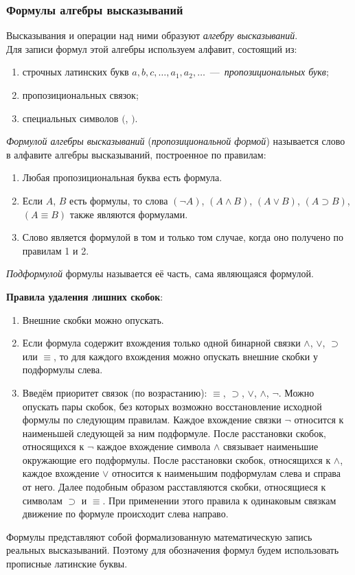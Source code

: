 \subsubsection{Формулы алгебры высказываний}\label{par:formulas_boolean}
Высказывания и операции над ними образуют \textit{алгебру высказываний}. \\
Для записи формул этой алгебры используем алфавит, состоящий из:
\begin{enumerate}
    \item строчных латинских букв $a, b, c, \dots, a_1, a_2, \dots$~---~\textit{пропозициональных букв}; 
    \item пропозициональных связок;
    \item специальных символов $($, $)$.
\end{enumerate}
\begin{definition*}
    \textit{Формулой алгебры высказываний} (\textit{пропозициональной формой}) называется слово в алфавите алгебры высказываний, построенное по правилам:
    \begin{enumerate}
        \item Любая пропозициональная буква есть формула.
        \item Если $A$, $B$ есть формулы, то слова $(\neg A)$, $(A \land B)$, $(A \lor B)$, $(A \supset B)$, $(A \equiv B)$ также являются формулами.
        \item Слово является формулой в том и только том случае, когда оно получено по правилам 1 и 2.
    \end{enumerate}
\end{definition*}
\begin{definition*}
    \textit{Подформулой} формулы называется её часть, сама являющаяся формулой.
\end{definition*}
\textbf{Правила удаления лишних скобок}:
\begin{enumerate}
    \item Внешние скобки можно опускать.
    \item Если формула содержит вхождения только одной бинарной связки $\land$, $\lor$, $\supset$ или $\equiv$, то для каждого вхождения можно опускать внешние скобки у подформулы слева.
    \item Введём приоритет связок (по возрастанию): $\equiv$, $\supset$, $\lor$, $\land$, $\neg$. Можно опускать пары скобок, без которых возможно восстановление исходной формулы по следующим правилам. Каждое вхождение связки $\neg$ относится к наименьшей следующей за ним подформуле. После расстановки скобок, относящихся к $\neg$ каждое вхождение символа $\land$ связывает наименьшие окружающие его подформулы. После расстановки скобок, относящихся к $\land$, каждое вхождение $\lor$ относится к наименьшим подформулам слева и справа от него. Далее подобным образом расставляются скобки, относящиеся к символам $\supset$ и $\equiv$. При применении этого правила к одинаковым связкам движение по формуле происходит слева направо.
\end{enumerate}
Формулы представляют собой формализованную математическую запись реальных высказываний. Поэтому для обозначения формул будем использовать прописные латинские буквы.

